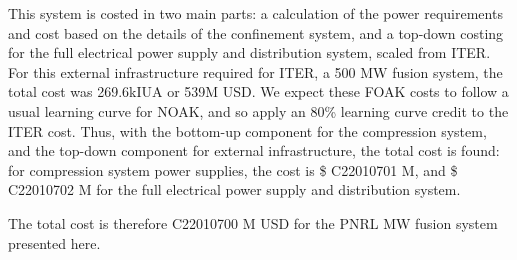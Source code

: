 This system is costed in two main parts: a calculation of the power requirements and cost based on the details of the confinement system, and a top-down costing for the full electrical power supply and distribution system, scaled from ITER. For this external infrastructure required for ITER, a 500 MW fusion system, the total cost was 269.6kIUA or 539M USD.
We expect these FOAK costs to follow a usual learning curve for NOAK, and so apply an 80\% learning curve credit to the ITER cost. Thus, with the bottom-up component for the compression system, and the top-down component for external infrastructure, the total cost is found: for compression system power supplies, the cost is \$ C22010701 M, and \$ C22010702 M for the full electrical power supply and distribution system.

The total cost is therefore C22010700 M USD for the PNRL MW fusion system presented here.


